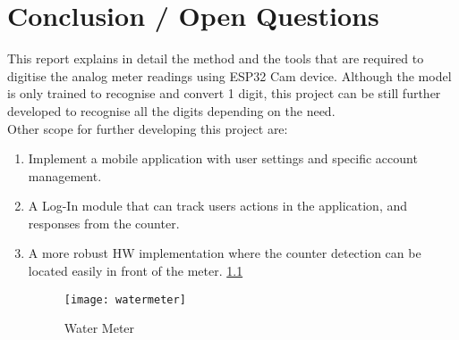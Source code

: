 %
%
%


\chapter{Conclusion / Open Questions}

This report explains in detail the method and the tools that are required to digitise the analog meter readings using ESP32 Cam device. Although the model is only trained to recognise and convert 1 digit, this project can be still further developed to recognise all the digits depending on the need. \\

Other scope for further developing this project are: 
\begin{enumerate}
	\item Implement a mobile application with user settings and specific account management.
	\item A Log-In module that can track users actions in the application, and responses from the counter.
	\item A more robust HW implementation where the counter detection can be located easily in front of the meter. \ref{fig:Water Meter}
	\begin{figure}  [H]
		\begin{center}
			\texttt{[image: watermeter]}
			\caption{Water Meter} 
			\label{fig:Water Meter}
		\end{center}
	\end{figure}
\end{enumerate}







